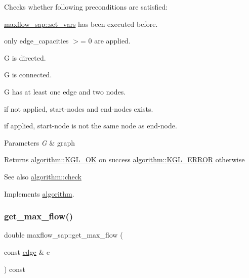 Checks whether following preconditions are satisfied\+: 
\begin{DoxyItemize}
\item \mbox{\hyperlink{classmaxflow__sap_ac50ba0330c169c7ce697947a76702e13}{maxflow\+\_\+sap\+::set\+\_\+vars}} has been executed before. 
\item only edge\+\_\+capacities $>$= 0 are applied. 
\item {\ttfamily G} is directed. 
\item {\ttfamily G} is connected. 
\item {\ttfamily G} has at least one edge and two nodes. 
\item if not applied, start-\/nodes and end-\/nodes exists. 
\item if applied, start-\/node is not the same node as end-\/node. 
\end{DoxyItemize}


\begin{DoxyParams}{Parameters}
{\em G} & graph \\
\hline
\end{DoxyParams}
\begin{DoxyReturn}{Returns}
{\ttfamily \mbox{\hyperlink{classalgorithm_af1a0078e153aa99c24f9bdf0d97f6710aae4c1cd7fe8d8cf4b143241a6e7c31cf}{algorithm\+::\+K\+G\+L\+\_\+\+OK}}} on success {\ttfamily \mbox{\hyperlink{classalgorithm_af1a0078e153aa99c24f9bdf0d97f6710ae67bf27b2ef31f73e545a7f9f4a69556}{algorithm\+::\+K\+G\+L\+\_\+\+E\+R\+R\+OR}}} otherwise 
\end{DoxyReturn}
\begin{DoxySeeAlso}{See also}
\mbox{\hyperlink{classalgorithm_a76361fb03ad1cf643affc51821e43bed}{algorithm\+::check}} 
\end{DoxySeeAlso}


Implements \mbox{\hyperlink{classalgorithm_a76361fb03ad1cf643affc51821e43bed}{algorithm}}.

\mbox{\label{classmaxflow__sap_ae90889b16323a2af0ab13e04c87953a5}} 
\subsubsection{\texorpdfstring{get\+\_\+max\+\_\+flow()}{get\_max\_flow()}\hspace{0.1cm}{\footnotesize\ttfamily [1/2]}}
{\footnotesize\ttfamily double maxflow\+\_\+sap\+::get\+\_\+max\+\_\+flow (\begin{DoxyParamCaption}\item[{const \mbox{\hyperlink{classedge}{edge}} \&}]{e }\end{DoxyParamCaption}) const}

